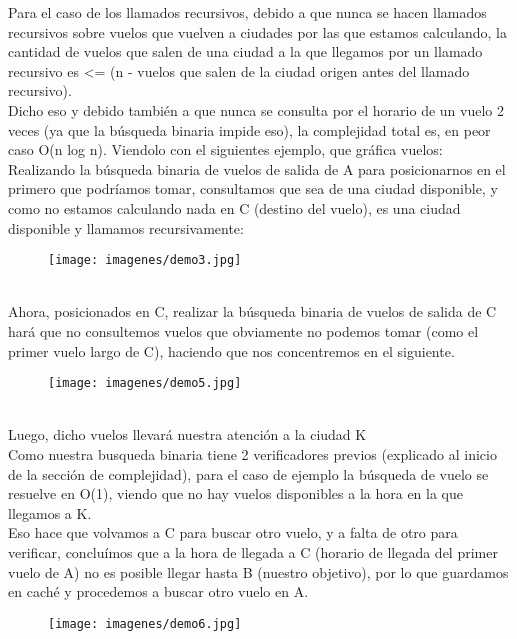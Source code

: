 Para el caso de los llamados recursivos, debido a que nunca se hacen llamados recursivos sobre vuelos que vuelven a ciudades por las que estamos calculando, la cantidad de vuelos que salen de una ciudad a la que llegamos por un llamado recursivo es \textless = (n - vuelos que salen de la ciudad origen antes del llamado recursivo).\\
Dicho eso y debido también a que nunca se consulta por el horario de un vuelo 2 veces (ya que la búsqueda binaria impide eso), la complejidad total es, en peor caso O(n log n). Viendolo con el siguientes ejemplo, que gráfica vuelos:\\

Realizando la búsqueda binaria de vuelos de salida de A para posicionarnos en el primero que podríamos tomar, consultamos que sea de una ciudad disponible, y como no estamos calculando nada en C (destino del vuelo), es una ciudad disponible y llamamos recursivamente:
\begin{figure}[h]
	\begin{center}
	   \texttt{[image: imagenes/demo3.jpg]}
	\end{center}
\end{figure}\\
Ahora, posicionados en C, realizar la búsqueda binaria de vuelos de salida de C hará que no consultemos vuelos que obviamente no podemos tomar (como el primer vuelo largo de C), haciendo que nos concentremos en el siguiente.
\begin{figure}[h]
	\begin{center}
	   \texttt{[image: imagenes/demo5.jpg]}
	\end{center}
\end{figure}\\
Luego, dicho vuelos llevará nuestra atención a la ciudad K\\ Como nuestra busqueda binaria tiene 2 verificadores previos (explicado al inicio de la sección de complejidad), para el caso de ejemplo la búsqueda de vuelo se resuelve en O(1), viendo que no hay vuelos disponibles a la hora en la que llegamos a K.\\
Eso hace que volvamos a C para buscar otro vuelo, y a falta de otro para verificar, concluímos que a la hora de llegada a C (horario de llegada del primer vuelo de A) no es posible llegar hasta B (nuestro objetivo), por lo que guardamos en caché y procedemos a buscar otro vuelo en A.
\begin{figure}[h]
	\begin{center}
	   \texttt{[image: imagenes/demo6.jpg]}
	\end{center}
\end{figure}\\
